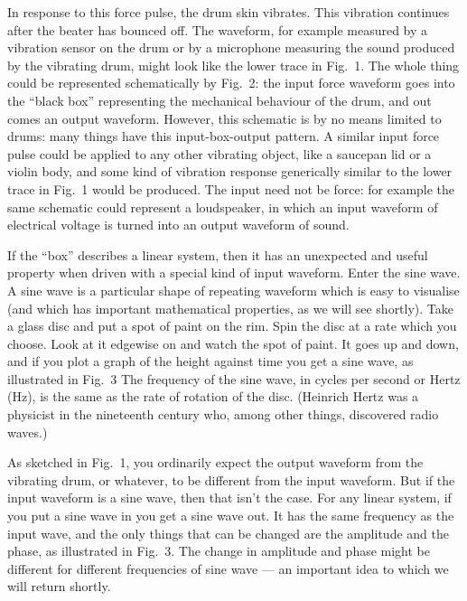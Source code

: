   In response to this force pulse, the drum skin vibrates. This vibration 
  continues after the beater has bounced off. The waveform, for example 
  measured by a vibration sensor on the drum or by a microphone measuring the 
  sound produced by the vibrating drum, might look like the lower trace in 
  Fig.\ 1. The whole thing could be represented schematically by Fig.\ 2: the 
  input force waveform goes into the ``black box'' representing the mechanical 
  behaviour of the drum, and out comes an output waveform. However, this 
  schematic is by no means limited to drums: many things have this 
  input-box-output pattern. A similar input force pulse could be applied to any 
  other vibrating object, like a saucepan lid or a violin body, and some kind 
  of vibration response generically similar to the lower trace in Fig.\ 1 would 
  be produced. The input need not be force: for example the same schematic 
  could represent a loudspeaker, in which an input waveform of electrical 
  voltage is turned into an output waveform of sound. 

  If the ``box'' describes a linear system, then it has an unexpected and 
  useful property when driven with a special kind of input waveform. Enter the 
  sine wave. A sine wave is a particular shape of repeating waveform which is 
  easy to visualise (and which has important mathematical properties, as we 
  will see shortly). Take a glass disc and put a spot of paint on the rim. Spin 
  the disc at a rate which you choose. Look at it edgewise on and watch the 
  spot of paint. It goes up and down, and if you plot a graph of the height 
  against time you get a sine wave, as illustrated in Fig.\ 3 The frequency of 
  the sine wave, in cycles per second or Hertz (Hz), is the same as the rate of 
  rotation of the disc. (Heinrich Hertz was a physicist in the nineteenth 
  century who, among other things, discovered radio waves.) 


  As sketched in Fig.\ 1, you ordinarily expect the output waveform from the 
  vibrating drum, or whatever, to be different from the input waveform. But if 
  the input waveform is a sine wave, then that isn't the case. For any linear 
  system, if you put a sine wave in you get a sine wave out. It has the same 
  frequency as the input wave, and the only things that can be changed are the 
  amplitude and the phase, as illustrated in Fig.\ 3. The change in amplitude 
  and phase might be different for different frequencies of sine wave --- an 
  important idea to which we will return shortly. 

